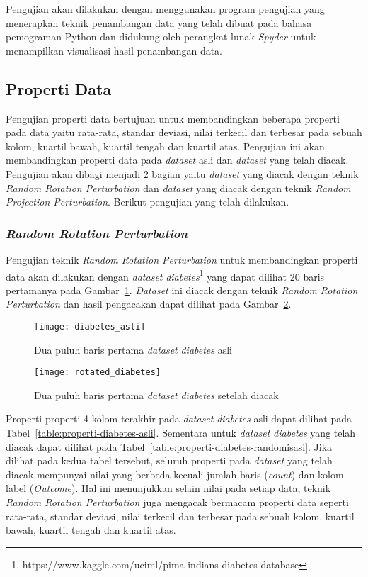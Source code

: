 Pengujian akan dilakukan dengan menggunakan program pengujian yang menerapkan teknik penambangan data yang telah dibuat pada bahasa pemograman Python dan didukung oleh perangkat lunak \textit{Spyder} untuk menampilkan visualisasi hasil penambangan data.

\subsection{Properti Data}
\label{subsec:pengujian-properti}

Pengujian properti data bertujuan untuk membandingkan beberapa properti pada data yaitu rata-rata, standar deviasi, nilai terkecil dan terbesar pada sebuah kolom, kuartil bawah, kuartil tengah dan kuartil atas. Pengujian ini akan membandingkan properti data pada \textit{dataset} asli dan \textit{dataset} yang telah diacak. Pengujian akan dibagi menjadi 2 bagian yaitu \textit{dataset} yang diacak dengan teknik \textit{Random Rotation Perturbation} dan \textit{dataset} yang diacak dengan teknik \textit{Random Projection Perturbation}. Berikut pengujian yang telah dilakukan.

\subsubsection{\textit{Random Rotation Perturbation}}
\label{subsubsec:pengujian-properti-rrp}

Pengujian teknik \textit{Random Rotation Perturbation} untuk membandingkan properti data akan dilakukan dengan \textit{dataset} \textit{diabetes}\footnote{https://www.kaggle.com/uciml/pima-indians-diabetes-database} yang dapat dilihat 20 baris pertamanya pada Gambar~\ref{fig:diabetes_asli}. \textit{Dataset} ini diacak dengan teknik \textit{Random Rotation Perturbation} dan hasil pengacakan dapat dilihat pada Gambar~\ref{fig:rotated_diabetes}.

\begin{figure}
	\centering
	\texttt{[image: diabetes\_asli]}
	\caption{Dua puluh baris pertama \textit{dataset} \textit{diabetes} asli}
	\label{fig:diabetes_asli}
\end{figure}

\begin{figure}
	\centering
	\texttt{[image: rotated\_diabetes]}
	\caption{Dua puluh baris pertama \textit{dataset} \textit{diabetes} setelah diacak}
	\label{fig:rotated_diabetes}
\end{figure}

Properti-properti 4 kolom terakhir pada \textit{dataset} \textit{diabetes} asli dapat dilihat pada Tabel~\ref{table:properti-diabetes-asli}. Sementara untuk \textit{dataset} \textit{diabetes} yang telah diacak dapat dilihat pada Tabel~\ref{table:properti-diabetes-randomisasi}. Jika dilihat pada kedua tabel tersebut, seluruh properti pada \textit{dataset} yang telah diacak mempunyai nilai yang berbeda kecuali jumlah baris (\textit{count}) dan kolom label (\textit{Outcome}). Hal ini menunjukkan selain nilai pada setiap data, teknik \textit{Random Rotation Perturbation} juga mengacak bermacam properti data seperti rata-rata, standar deviasi, nilai terkecil dan terbesar pada sebuah kolom, kuartil bawah, kuartil tengah dan kuartil atas.
	
